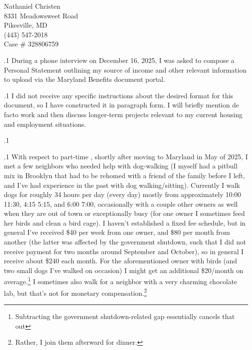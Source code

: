 \documentclass[11pt, twoside]{article}
\begin{document}
\thispagestyle{empty}

\vspace*{-3em}

{\fontsize{12}{15}\selectfont
\noindent{}Nathaniel Christen\\
8331 Meadowsweet Road\\
Pikesville, MD\\
(443) 547-2018\\
Case \# 328806759
}

{\fontsize{13}{19}\selectfont

\vspace*{3em}

\hspace{-5em}\begin{minipage}{1.1\textwidth}
\begin{flushright}
{\fontsize{14}{22}\selectfont
\textbf{%
\dunderline[-8pt]{3pt}{\textcolor{hrcb!25!black}{Personal Statement}}}
}
\end{flushright}
\end{minipage}


\vspace{4em}




\p.1{%
\noindent{}During a phone interview on December 16, 2025, I
was asked to compose a Personal Statement outlining
my source of income and other relevant information
to upload via the Maryland Benefits document portal.
}%

\p.1{%
I did not receive any specific instructions
about the desired format for this document, so I
have constructed it in paragraph form.
I will briefly mention de facto 
work and then discuss longer-term projects
relevant to my current housing and employment situations.
}%

\p.1{%
\ghrule{}
}%

\p.1{%
With respect to part-time , shortly after
moving to Maryland in May of 2025, I met a few
neighbors who needed help with dog-walking (I myself
had a pitbull mix in Brooklyn that had to be rehomed
with a friend of the family before I left, and I've had
experience in the past with dog walking/sitting).
Currently I walk dogs for roughly 3\ndash{}4 hours per
day (every day) mostly from approximately 10:00 \ndash{} 11:30,
4:15 \ndash{} 5:15, and 6:00 \ndash{} 7:00, occasionally with a
couple other owners as well when they are out of town
or exceptionally busy (for one owner I sometimes
feed her birds and clean a bird cage). I haven't
established a fixed fee schedule, but in general I've
received \$40 per week from one owner, and \$80 per month
from another (the latter was affected by the government
shutdown, such that I did not receive payment for two
months around September and October), so in general
I receive about \$240 each month. For the aforementioned
owner with birds (and two small dogs I've walked on occasion)
I might get an additional \$20/month on average.\footnote{Subtracting
the government shutdown-related gap essentially cancels that out}
I sometimes also walk for a neighbor with a very charming chocolate
lab, but that's not for monetary compensation.\footnote{Rather, I join them
afterward for dinner.}
}%

}
\end{document}
